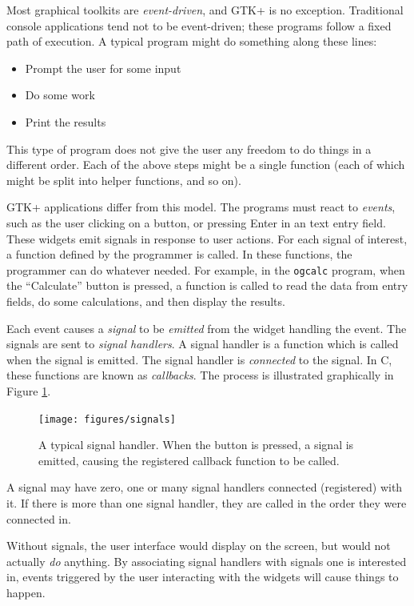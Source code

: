 \documentclass[a4paper,oneside]{article}
\newcommand{\program}[1]{\texttt{#1}}
\begin{document}
Most graphical toolkits are \emph{event-driven}, and GTK+ is no
exception.  Traditional console applications tend not to be
event-driven; these programs follow a fixed path of execution.  A
typical program might do something along these lines:

\begin{itemize}
\item{Prompt the user for some input}
\item{Do some work}
\item{Print the results}
\end{itemize}

\noindent This type of program does not give the user any freedom to
do things in a different order.  Each of the above steps might be a
single function (each of which might be split into helper functions,
and so on).

GTK+ applications differ from this model.  The programs must react to
\emph{events}, such as the user clicking on a button, or pressing
Enter in an text entry field.  These widgets emit signals in response
to user actions.  For each signal of interest, a function defined by
the programmer is called.  In these functions, the programmer can do
whatever needed.  For example, in the \program{ogcalc} program, when
the ``Calculate'' button is pressed, a function is called to read the
data from entry fields, do some calculations, and then display the
results.

Each event causes a \emph{signal} to be \emph{emitted} from the widget
handling the event.  The signals are sent to \emph{signal handlers}.
A signal handler is a function which is called when the signal is
emitted.  The signal handler is \emph{connected} to the signal.  In C,
these functions are known as \emph{callbacks}.  The process is
illustrated graphically in Figure \ref{fig:signals}.

\begin{figure}
  \centering
  \texttt{[image: figures/signals]}
  \caption[A typical signal handler]{A typical signal handler.  When
    the button is pressed, a signal is emitted, causing the registered
    callback function to be called.}
  \label{fig:signals}
\end{figure}

A signal may have zero, one or many signal handlers connected
(registered) with it.  If there is more than one signal handler, they
are called in the order they were connected in.

Without signals, the user interface would display on the screen, but
would not actually \emph{do} anything.  By associating signal handlers
with signals one is interested in, events triggered by the user
interacting with the widgets will cause things to happen.
\end{document}
